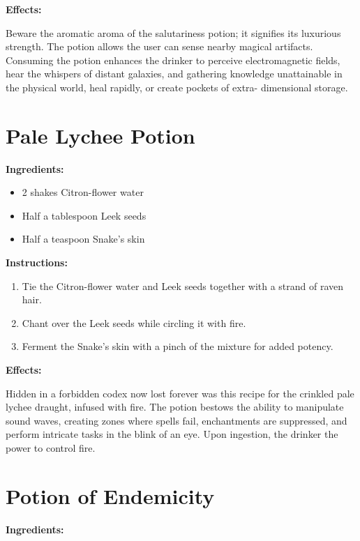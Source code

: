 \documentclass{article}
\begin{document}
\textbf{Effects:}

Beware the aromatic aroma of the salutariness potion; it signifies its luxurious strength. The potion allows the user can sense nearby magical artifacts. Consuming the potion enhances the drinker to perceive electromagnetic fields, hear the whispers of distant galaxies, and gathering knowledge unattainable in the physical world, heal rapidly, or create pockets of extra- dimensional storage.

\newpage
\section*{Pale Lychee Potion}

\textbf{Ingredients:}

\begin{itemize}
  \item 2 shakes Citron-flower water
  \item Half a tablespoon Leek seeds
  \item Half a teaspoon Snake's skin
\end{itemize}

\textbf{Instructions:}

\begin{enumerate}
  \item Tie the Citron-flower water and Leek seeds together with a strand of raven hair.
  \item Chant over the Leek seeds while circling it with fire.
  \item Ferment the Snake's skin with a pinch of the mixture for added potency.
\end{enumerate}

\textbf{Effects:}

Hidden in a forbidden codex now lost forever was this recipe for the crinkled pale lychee draught, infused with fire. The potion bestows the ability to manipulate sound waves, creating zones where spells fail, enchantments are suppressed, and perform intricate tasks in the blink of an eye. Upon ingestion, the drinker the power to control fire.

\newpage
\section*{Potion of Endemicity}

\textbf{Ingredients:}
\end{document}
